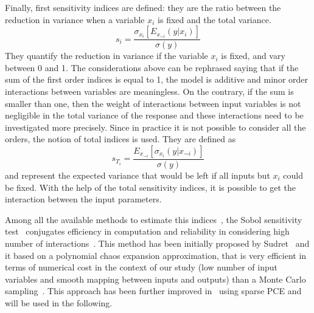 Finally, first sensitivity indices are defined: they are the ratio between the reduction in variance when a variable $x_i$ is fixed and the total variance.
\begin{equation}
\label{eq:first_order_sobol_indices_def}
s_i = \frac{\sigma_{x_{i}}\left[E_{x_{\sim i}}\left(y|x_i\right)\right]}{\sigma\left(y\right)}
\end{equation}
They quantify the reduction in variance if the variable $x_i$ is fixed, and vary between 0 and 1. 
The considerations above can be rephrased saying that if the sum of the first order indices is equal to 1, the model is additive and minor order interactions between variables are meaningless. 
On the contrary, if the sum is smaller than one, then the weight of interactions between input variables is not negligible in the total variance of the response and these interactions need to be investigated more precisely.
Since in practice it is not possible to consider all the orders, the notion of total indices is used. 
They are defined as
\begin{equation}
\label{eq:total_sobol_indices_def}
s_{T_{i}} = \frac{E_{x_{\sim i}}\left[\sigma_{x_{i}}\left(y|x_{\sim i}\right)\right]}{\sigma\left(y\right)}
\end{equation}
and represent the expected variance that would be left if all inputs but $x_i$ could be fixed. 
With the help of the total sensitivity indices, it is possible to get the interaction between the input parameters. 

Among all the available methods to estimate this indices~\cite{bib:mckay, bib:sobol_1993, bib:cukier}, the Sobol sensitivity test~\cite{bib:sobol_1993} conjugates efficiency in computation and reliability in considering high number of interactions~\cite{bib:saltelli_2004}. 
This method has been initially proposed by Sudret~\cite{bib:sudret} and it based on a polynomial chaos expansion approximation, that is very efficient in terms of numerical cost in the context of our study (low number of input variables and smooth mapping between inputs and outputs) than a Monte Carlo sampling~\cite{bib:sobol_1993}.
This approach has been further improved in~\cite{bib:blatman} using sparse PCE and will be used in the following.

